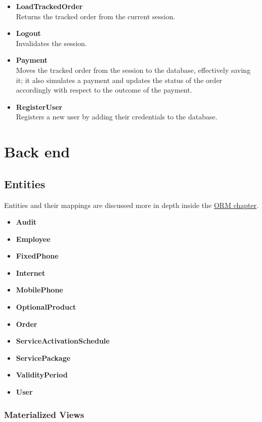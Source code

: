 \begin{itemize}[leftmargin = \leftmargin + 1em, itemindent = -1em]
    \item \textbf{LoadTrackedOrder} \\
        Returns the tracked order from the current session.
    \item \textbf{Logout} \\
        Invalidates the session.
    \item \textbf{Payment} \\
        Moves the tracked order from the session to the database, effectively saving it; it also simulates a payment and updates the status of the order accordingly with respect to the outcome of the payment.
    \item \textbf{RegisterUser} \\
        Registers a new user by adding their credentials to the database.

\end{itemize}

\section{Back end}

\subsection{Entities}

Entities and their mappings are discussed more in depth inside the \hyperref[chap:orm]{ORM chapter}.

\begin{itemize}
    \item \textbf{Audit}
    \item \textbf{Employee}
    \item \textbf{FixedPhone}
    \item \textbf{Internet}
    \item \textbf{MobilePhone}
    \item \textbf{OptionalProduct}
    \item \textbf{Order}
    \item \textbf{ServiceActivationSchedule}
    \item \textbf{ServicePackage}
    \item \textbf{ValidityPeriod}
    \item \textbf{User}
\end{itemize}

\subsubsection*{Materialized Views}


